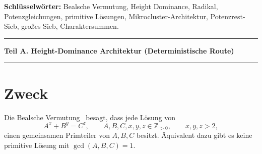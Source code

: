 \documentclass[11pt,a4paper]{article}
\begin{document}
\begin{abstract}
\emph{Teil B (asymptotischer Sieb-Begleiter).}
Für positive primitive Lösungen mit festem $K\ge4$ und $3\le x,y,z\le K$,
ohne $(3,3,3)$, ergibt die korrigierte positive Zeilenrekonstruktion auf
klassischen Jacobi-/Weil- und Großsieb-Eingaben
$T_K(H)\ll_{K,\varepsilon}H^{2/3}/\Sigma(Q;K)$ für hinreichend große $H$
und $(\log H)^{2+\varepsilon}\le Q\le H^{1/(2K)}$.
Der untere Cut ist hinreichend, nicht notwendig. Die ganzzahlige Nullzeile
wird ausgeschlossen; Nullrestzeilen, leere Klassen und ein verschwindendes
Ausschlussbudget werden ausdrücklich behandelt. Keine explizite Schwelle
$H_0(K,\varepsilon)$ und kein effektives Konstantenpaket sind hier zertifiziert.
Das formale HD2'-Entropiebudget folgt asymptotisch aus Dichten für feste
Exponenten und Primzahlen in festen arithmetischen Progressionen; es ist
von den Basen unabhängig und beweist keine Wurzelkohärenz.
Die exponentielle Schranke der kumulativen positiven Lösungszählung würde
unter diesen Entropie-Eingaben $T_K\equiv0$ erzwingen; für alle festen $K$
ist sie bereits Beal-stark und keine schwache Zwischenschranke.

Version 1.1 berichtigt Genus- und Regime-Klassifikation, Nullzeilenrichtung
und Siebdomänen, skalare Monodromie und starke Charaktersummen sowie die
Reichweite des klassischen $(3,4,5)$-Resultats. Die elementare Ungleichung
$\Xi\ge\log4$ liefert keine IUT-/gcd-Brücke; historische Diagnosescores und
fest gesetzte Gates liefern keinen Beal-Ausschluss. Numerische Tabellen
bleiben historische Diagnostik. HD3', getypte Transfers, explizite Konstanten,
unabhängige Methodenvalidierung und vollständige Quellen-/Beweisprüfung bleiben offen.
\end{abstract}

\noindent\textbf{Schlüsselwörter:} Bealsche Vermutung, Height Dominance, Radikal, Potenzgleichungen, primitive Lösungen, Mikrocluster-Architektur, Potenzrest-Sieb, großes Sieb, Charaktersummen.

\clearpage
\tableofcontents
\clearpage

\bigskip
\hrule
\medskip
\begin{center}
\textbf{Teil A. Height-Dominance Architektur (Deterministische Route)}
\end{center}
\medskip
\hrule
\bigskip

\section{Zweck}

Die Bealsche Vermutung~\cite{Mauldin1997} besagt, dass jede Lösung von
\[
  A^x + B^y = C^z,
  \qquad A,B,C,x,y,z \in \mathbb Z_{>0},
  \qquad x,y,z>2,
\]
einen gemeinsamen Primteiler von $A,B,C$ besitzt. Äquivalent dazu gibt es keine primitive Lösung mit $\gcd(A,B,C)=1$.
\end{document}
